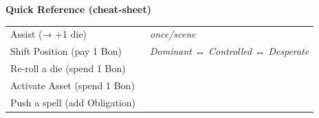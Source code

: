 \documentclass[paper=a4,landscape,12pt]{article}
\newcommand{\cmark}{\ding{51}}   %
\begin{document}
\vspace{0.4cm}
\textbf{Quick Reference (cheat‑sheet)}\\
\begin{tabular}{ll}
Assist (→ +1 die)                     & \cmark\ \textit{once/scene}\\
Shift Position (pay 1 Bo​n)           & \cmark\ \textit{Dominant ↔ Controlled ↔ Desperate}\\
Re‑roll a die (spend 1 Bo​n)         & \cmark\\
Activate Asset (spend 1 Bo​n)         & \cmark\\
Push a spell (add Obligation)        & \cmark\\
\end{tabular}
\end{document}
